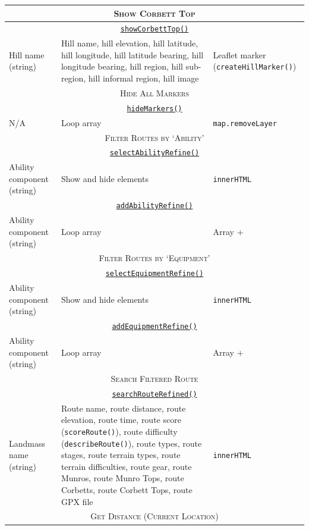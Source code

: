 \documentclass[11pt, english]{article}
\begin{document}
\begin{center}
\begin{longtable}{p{4cm}p{6cm}p{2cm}}
		\hline
		\multicolumn{3}{c}{\textsc{Show Corbett Top}}\\
		\hline
		\multicolumn{3}{c}{\underline{\texttt{showCorbettTop()}}}\\
		Hill name (string) & Hill name, hill elevation, hill latitude, hill longitude, hill latitude bearing, hill longitude bearing, hill region, hill sub-region, hill informal region, hill image & Leaflet marker (\texttt{createHillMarker()})\\
		\hline
		\multicolumn{3}{c}{\textsc{Hide All Markers}}\\
		\hline
		\multicolumn{3}{c}{\underline{\texttt{hideMarkers()}}}\\
		N/A & Loop array & \texttt{map.removeLayer}\\
		\hline
		\multicolumn{3}{c}{\textsc{Filter Routes by `Ability'}}\\
		\hline
		\multicolumn{3}{c}{\underline{\texttt{selectAbilityRefine()}}}\\
		Ability component (string) & Show and hide elements & \texttt{innerHTML}\\
		\multicolumn{3}{c}{\underline{\texttt{addAbilityRefine()}}}\\
		Ability component (string) & Loop array & Array $+$\\
		\hline
		\multicolumn{3}{c}{\textsc{Filter Routes by `Equipment'}}\\
		\hline
		\multicolumn{3}{c}{\underline{\texttt{selectEquipmentRefine()}}}\\
		Ability component (string) & Show and hide elements & \texttt{innerHTML}\\
		\multicolumn{3}{c}{\underline{\texttt{addEquipmentRefine()}}}\\
		Ability component (string) & Loop array & Array $+$\\
		\hline
		\multicolumn{3}{c}{\textsc{Search Filtered Route}}\\
		\hline
		\multicolumn{3}{c}{\underline{\texttt{searchRouteRefined()}}}\\
		Landmass name (string) & Route name, route distance, route elevation, route time, route score (\texttt{scoreRoute()}), route difficulty (\texttt{describeRoute()}), route types, route stages, route terrain types, route terrain difficulties, route gear, route Munros, route Munro Tops, route Corbetts, route Corbett Tops, route GPX file & \texttt{innerHTML}\\
		\hline
		\multicolumn{3}{c}{\textsc{Get Distance (Current Location)}}\\

\end{longtable}
\end{center}
\end{document}
